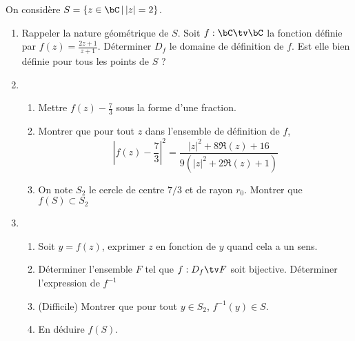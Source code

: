 \begin{exercice}
On considère $ S= \{ z\in \bC\, | \, |z|=2\}$.
\begin{enumerate}
\item Rappeler la nature géométrique de $S$.
Soit $f : \bC \tv \bC $ la fonction définie par $f(z) =\frac{2z +1}{z+1}$. Déterminer $D_f$ le domaine de définition de $f$. Est elle bien définie pour tous les points de $S$ ? 
\item 
\begin{enumerate}
\item Mettre $f(z) -\frac{7}{3}$ sous la forme d'une fraction. 
\item Montrer que pour tout $z$ dans l'ensemble de définition de $f$, $$\left| f(z) -\frac{7}{3}\right|^2 = \frac{|z|^2 +8\Re(z) +16 }{9 (|z|^2 +2\Re(z) +1)}$$
\item On note $S_2$ le cercle de centre $7/3$ et de rayon $r_0$. Montrer que $f(S) \subset S_2$
\end{enumerate}
\item
\begin{enumerate}
\item  Soit $y =f(z)$, exprimer $z$ en fonction de $y$ quand cela a un sens. 
\item Déterminer l'ensemble $F$ tel que $f : D_f \tv F$ soit bijective. Déterminer l'expression de $f^{-1}$ 
\item (Difficile) Montrer que pour tout $y\in S_2$, $f^{-1}(y) \in S$. 
\item En déduire $f(S).$ 
\end{enumerate}

\end{enumerate}
\end{exercice}

